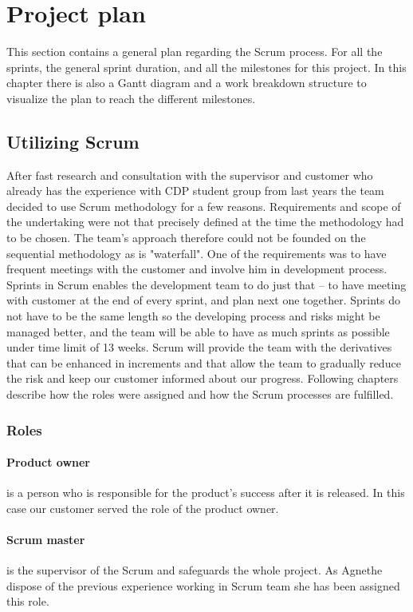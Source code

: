 \section{Project plan}
This section contains a general plan regarding the Scrum process. For all the sprints, the general sprint duration, and all the milestones for this project. In this chapter there is also a Gantt diagram and a work breakdown structure to visualize the plan to reach the different milestones.

\subsection{Utilizing Scrum} \label{txt:utilizing_scrum}

After fast research and consultation with the supervisor and customer who already has the experience with CDP student group from last years the team decided to use Scrum methodology for a few reasons. Requirements and scope of the undertaking were not that precisely defined at the time the methodology had to be chosen. The team's approach therefore could not be founded on the sequential methodology as is "waterfall". One of the requirements was to have frequent meetings with the customer and involve him in development process. Sprints in Scrum enables the development team to do just that --
to have meeting with customer at the end of every sprint, and plan next one together. Sprints do not have to be the same length so the developing process and risks might be managed better, and the team will be able to have as much sprints as possible under time limit of 13 weeks. Scrum will provide the team with the derivatives that can be enhanced in increments and that allow the team to gradually reduce the risk and keep our customer informed about our progress. Following chapters describe how the roles were assigned and how the Scrum processes are fulfilled.

\subsubsection{Roles}
\paragraph{Product owner} is a person who is responsible for the product's success after it is released. In this case our customer served the role of the product owner.
\paragraph{Scrum master} is the supervisor of the Scrum and safeguards the whole project. As Agnethe dispose of the previous experience working in Scrum team she has been assigned this role.
